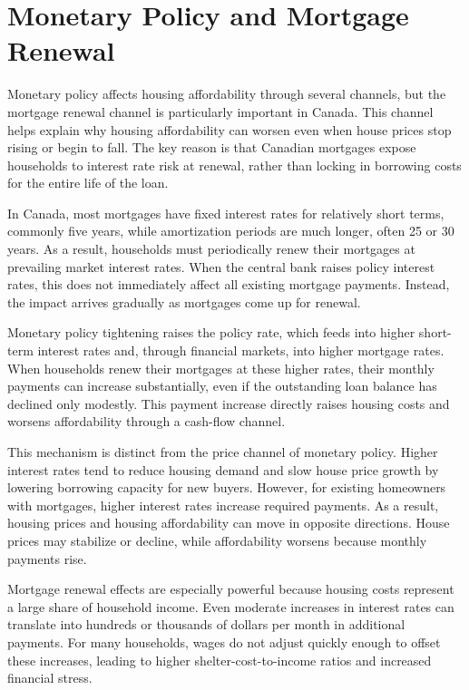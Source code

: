 \documentclass[11pt]{article}
\begin{document}
\section{Monetary Policy and Mortgage Renewal}

Monetary policy affects housing affordability through several channels, but the mortgage renewal channel is particularly important in Canada. This channel helps explain why housing affordability can worsen even when house prices stop rising or begin to fall. The key reason is that Canadian mortgages expose households to interest rate risk at renewal, rather than locking in borrowing costs for the entire life of the loan.

In Canada, most mortgages have fixed interest rates for relatively short terms, commonly five years, while amortization periods are much longer, often 25 or 30 years. As a result, households must periodically renew their mortgages at prevailing market interest rates. When the central bank raises policy interest rates, this does not immediately affect all existing mortgage payments. Instead, the impact arrives gradually as mortgages come up for renewal.

Monetary policy tightening raises the policy rate, which feeds into higher short-term interest rates and, through financial markets, into higher mortgage rates. When households renew their mortgages at these higher rates, their monthly payments can increase substantially, even if the outstanding loan balance has declined only modestly. This payment increase directly raises housing costs and worsens affordability through a cash-flow channel.

This mechanism is distinct from the price channel of monetary policy. Higher interest rates tend to reduce housing demand and slow house price growth by lowering borrowing capacity for new buyers. However, for existing homeowners with mortgages, higher interest rates increase required payments. As a result, housing prices and housing affordability can move in opposite directions. House prices may stabilize or decline, while affordability worsens because monthly payments rise.

Mortgage renewal effects are especially powerful because housing costs represent a large share of household income. Even moderate increases in interest rates can translate into hundreds or thousands of dollars per month in additional payments. For many households, wages do not adjust quickly enough to offset these increases, leading to higher shelter-cost-to-income ratios and increased financial stress.
\end{document}
